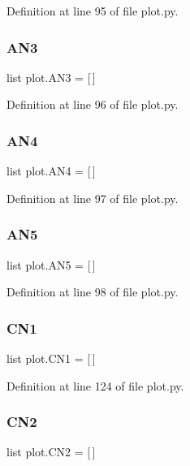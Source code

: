 Definition at line 95 of file plot.\+py.

\mbox{\label{namespaceplot_a71a9cd7192fe4c7946db171570a97a3f}} 
\subsubsection{A\+N3}
{\footnotesize\ttfamily list plot.\+A\+N3 = [$\,$]}



Definition at line 96 of file plot.\+py.

\mbox{\label{namespaceplot_a8432fad0ae8977d6c9f163d7375a7d15}} 
\subsubsection{A\+N4}
{\footnotesize\ttfamily list plot.\+A\+N4 = [$\,$]}



Definition at line 97 of file plot.\+py.

\mbox{\label{namespaceplot_ae6ebc7bdab88b49ef0bdb8267816099c}} 
\subsubsection{A\+N5}
{\footnotesize\ttfamily list plot.\+A\+N5 = [$\,$]}



Definition at line 98 of file plot.\+py.

\mbox{\label{namespaceplot_ab6b58807374a6c003514ad6c0325484b}} 
\subsubsection{C\+N1}
{\footnotesize\ttfamily list plot.\+C\+N1 = [$\,$]}



Definition at line 124 of file plot.\+py.

\mbox{\label{namespaceplot_a4917241c1d52fb9ec3badaaafe51557a}} 
\subsubsection{C\+N2}
{\footnotesize\ttfamily list plot.\+C\+N2 = [$\,$]}



